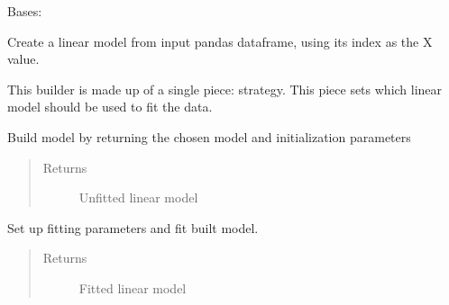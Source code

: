 \documentclass[letterpaper,10pt,english]{sphinxmanual}
\begin{document}
\begin{fulllineitems}
\label{\detokenize{dalio.pipe:dalio.pipe.builders.PandasLinearModel}}
Bases: {\hyperref[\detokenize{dalio.pipe:dalio.pipe.pipe.PipeBuilder}]{}}

Create a linear model from input pandas dataframe, using its index
as the X value.

This builder is made up of a single piece: strategy. This piece sets
which linear model should be used to fit the data.

\begin{fulllineitems}
\label{\detokenize{dalio.pipe:dalio.pipe.builders.PandasLinearModel.build_model}}
Build model by returning the chosen model and initialization
parameters
\begin{quote}\begin{description}
\item[{Returns}] \leavevmode
Unfitted linear model

\end{description}\end{quote}

\end{fulllineitems}


\begin{fulllineitems}
\label{\detokenize{dalio.pipe:dalio.pipe.builders.PandasLinearModel.transform}}
Set up fitting parameters and fit built model.
\begin{quote}\begin{description}
\item[{Returns}] \leavevmode
Fitted linear model

\end{description}\end{quote}

\end{fulllineitems}


\end{fulllineitems}
\end{document}
